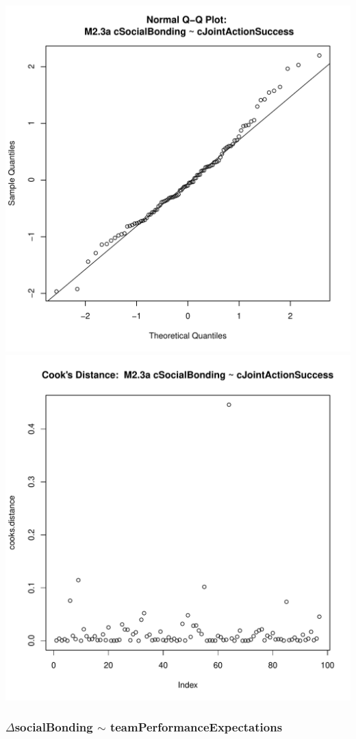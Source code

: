 \documentclass[12pt]{report}
\begin{document}
\includegraphics[scale =.4]{../images/MLM23aQQNorm.pdf}
\includegraphics[scale =.4]{../images/MLM23aCooksD.pdf}


\newpage
\subsubsection{$\Delta$socialBonding $\sim$ teamPerformanceExpectations}
\end{document}
